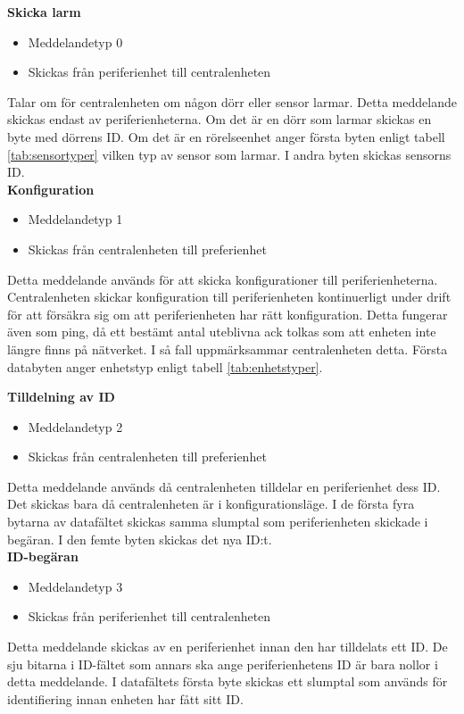 \textbf{Skicka larm}
\begin{itemize}
    \item Meddelandetyp 0
    \item Skickas från periferienhet till centralenheten
\end{itemize}
Talar om för centralenheten om någon dörr eller sensor larmar. Detta meddelande skickas endast av periferienheterna. Om det är en dörr som larmar skickas en byte med dörrens ID. Om det är en rörelseenhet anger första byten enligt tabell \ref{tab:sensortyper} vilken typ av sensor som larmar. I andra byten skickas sensorns ID.\\


\textbf{Konfiguration}
\begin{itemize}
    \item Meddelandetyp 1
    \item Skickas från centralenheten till preferienhet
\end{itemize}
Detta meddelande används för att skicka konfigurationer till periferienheterna.
Centralenheten skickar konfiguration till periferienheten kontinuerligt under drift för att försäkra sig om att periferienheten har rätt konfiguration. Detta fungerar även som ping, då ett bestämt antal uteblivna ack tolkas som att enheten inte längre finns på nätverket.
I så fall uppmärksammar centralenheten detta.
Första databyten anger enhetstyp enligt tabell \ref{tab:enhetstyper}.


\textbf{Tilldelning av ID}
\begin{itemize}
    \item Meddelandetyp 2
    \item Skickas från centralenheten till preferienhet
\end{itemize}
Detta meddelande används då centralenheten tilldelar en periferienhet dess ID. Det skickas bara då centralenheten är i konfigurationsläge. I de första fyra bytarna av datafältet skickas samma slumptal som periferienheten skickade i begäran. I den femte byten skickas det nya ID:t. \\


\textbf{ID-begäran}
\begin{itemize}
    \item Meddelandetyp 3
    \item Skickas från periferienhet till centralenheten
\end{itemize}
Detta meddelande skickas av en periferienhet innan den har tilldelats ett ID. De sju bitarna i ID-fältet som annars ska ange periferienhetens ID är bara nollor i detta meddelande. I datafältets första byte skickas ett slumptal som används för identifiering innan enheten har fått sitt ID.

